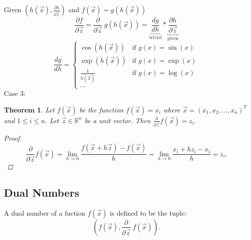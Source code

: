 \documentclass[a0,landscape]{a0poster}
\newtheorem{thm}{Theorem}
\begin{document}
\begin{multicols}{4}
    Given $\left(h(\vec{x}),\frac{\partial h}{\partial\vec{z}}\right)$ and $f(\vec{x})=g(h(\vec{x}))$
    \begin{equation}
        \frac{\partial f}{\partial\vec{z}}=\frac{\partial}{\partial\vec{z}}\;g(h(\vec{x}))=\underbracket{\frac{dg}{dh}}_{\text{trivial}}*\underbracket{\frac{\partial h}{\partial\vec{z}}}_{\text{given}}
    \end{equation}
    \begin{equation}
        \frac{dg}{dh}=
            \begin{cases}
                \cos{(h(\vec{x}))} & \text{if } g(x) = \sin{(x)}\\
                \exp{(h(\vec{x}))} & \text{if } g(x) = \exp{(x)}\\
                \frac{1}{h(\vec{x})} & \text{if } g(x) = \log{(x)}\\
                \dots
            \end{cases}
    \end{equation}
Case 3:
    
\begin{thm}
    Let $f(\vec{x})$ be the function $f(\vec{x})=x_i$ where $\vec{x}=(x_1,x_2,\dots,x_n)^T$ and $1\leq i\leq n$.
    Let $\vec{z}\in\mathbb{R}^n$ be a unit vector. 
    Then $\frac{\partial}{\partial\vec{z}}f(\vec{x})=z_i$.
    \begin{proof}
        $$\frac{\partial}{\partial\vec{z}}f(\vec{x})=\lim_{h\rightarrow0}\frac{f(\vec{x} + h\vec{z}) - f(\vec{x})}{h}=\lim_{h\rightarrow0}\frac{x_i + hz_i - x_i}{h}=z_i.$$
    \end{proof}
\end{thm}
\subsection*{Dual Numbers}
A dual number of a fuction $f(\vec{x})$ is defined to be the tuple: 
$$\left(f(\vec{x}),\frac{\partial}{\partial\vec{z}}\;f(\vec{x})\right).$$


\end{multicols}
\end{document}
